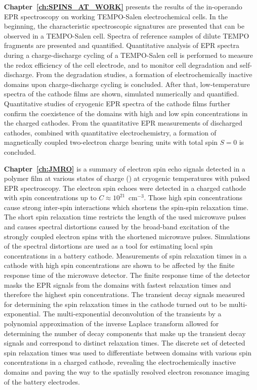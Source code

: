 \par
\textbf{Chapter~\ref{ch:SPINS_AT_WORK}} presents the results of the in-operando EPR spectroscopy on working TEMPO-Salen electrochemical cells. In the beginning, the characteristic spectroscopic signatures are presented that can be observed in a TEMPO-Salen cell. Spectra of reference samples of dilute TEMPO fragments are presented and quantified. Quantitative analysis of EPR spectra during a charge-discharge cycling of a TEMPO-Salen cell is performed to measure the redox efficiency of the cell electrode, and to monitor cell degradation and self-discharge. From the degradation studies, a formation of electrochemically inactive domains upon charge-discharge cycling is concluded. After that, low-temperature spectra of the cathode films are shown, simulated numerically and quantified. Quantitative studies of cryogenic EPR spectra of the cathode films further confirm the coexistence of the domains with high and low spin concentrations in the charged cathodes. From the quantitative EPR measurements of discharged cathodes, combined with quantitative electrochemistry, a formation of magnetically coupled two-electron charge bearing units with total spin $S=0$ is concluded.\\ 

\par
\textbf{Chapter~\ref{ch:JMRO}} is a summary of electron spin echo signals detected in a polymer  film at various states of charge () at cryogenic temperatures with pulsed EPR spectroscopy. The electron spin echoes were detected in a charged cathode with spin concentrations up to $C\approx10^{21}$~cm$^{-3}$. Those high spin concentrations cause strong inter-spin interactions which shortens the spin-spin relaxation time. The short spin relaxation time restricts the length of the used microwave pulses and causes spectral distortions caused by the broad-band excitation of the strongly coupled electron spins with the shortened microwave pulses. Simulations of the spectral distortions are used as a tool for estimating local spin concentrations in a battery cathode. Measurements of spin relaxation times in a cathode with high spin concentrations are shown to be affected by the finite response time of the microwave detector. The finite response time of the detector masks the EPR signals from the domains with fastest relaxation times and therefore the highest spin concentrations. The transient decay signals measured for determining the spin relaxation times in the cathode turned out to be multi-exponential. The multi-exponential deconvolution of the transients by a polynomial approximation of the inverse Laplace transform allowed for determining the number of decay components that make up the transient decay signals and correspond to distinct relaxation times. The discrete set of detected spin relaxation times was used to differentiate between domains with various spin concentrations in a charged cathode, revealing the electrochemically inactive domains and paving the way to the spatially resolved electron resonance imaging of the battery electrodes.\\


